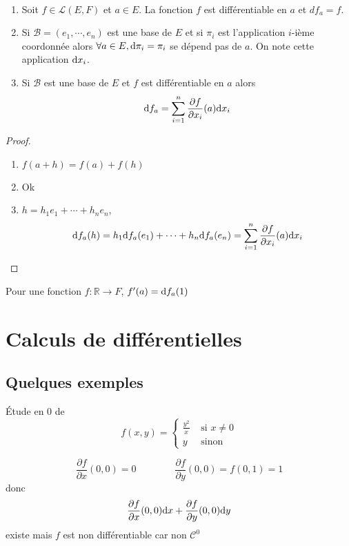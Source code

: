 \begin{thmdef}
    ~ \begin{enumerate}
        \item Soit $f\in\mathcal L(E, F)$ et $a\in E$. La fonction $f$ est différentiable en $a$ et $df_a=f$.
        \item Si $\mathcal B=(e_1, \cdots, e_n)$ est une base de $E$ et si $\pi_i$ est l'application $i$-ième coordonnée alors $\forall a\in E, \mathrm{d} \pi_i=\pi_i$ se dépend pas de $a$. On note cette application $\mathrm{d} x_i$.
        \item Si $\mathcal B$ est une base de $E$ et $f$ est différentiable en $a$ alors \[
                \mathrm{d} f_a=\sum_{i=1}^n\frac{\partial f}{\partial x_i}(a)\mathrm{d} x_i
            \]
    \end{enumerate}
\end{thmdef}

\begin{proof} ~
    \begin{enumerate}
        \item $f(a+h)=f(a)+f(h)$
        \item Ok
        \item $h=h_1e_1+\cdots +h_ne_n$, \[
                \mathrm{d} f_a(h)=h_1\mathrm{d} f_a(e_1)+\cdots +h_n\mathrm{d} f_a(e_n)=\sum_{i=1}^n\frac{\partial f}{\partial x_i}(a)\mathrm{d} x_i
            \]
    \end{enumerate}
\end{proof}

\begin{rem}
    Pour une fonction $f:\mathbb R\longrightarrow F$, $f'(a)=\mathrm{d} f_a(1)$
\end{rem}

\section{Calculs de différentielles}

\subsection{Quelques exemples}
\begin{ex} Étude en $0$ de
    \[
        f(x, y)=\begin{cases}
            \frac{y^2}x &\text{ si }x\neq 0\\ y & \text{ sinon}
        \end{cases}
    \]
\end{ex}

\[
    \frac{\partial f}{\partial x}(0, 0)=0 \qquad\qquad \frac{\partial f}{\partial y}(0, 0)=f(0, 1)=1
\]
donc \[
    \frac{\partial f}{\partial x}(0, 0) \mathrm{d} x+ \frac{\partial f}{\partial y}(0, 0)\mathrm{d} y
\]
existe mais $f$ est non différentiable car non $\mathcal C^0$

